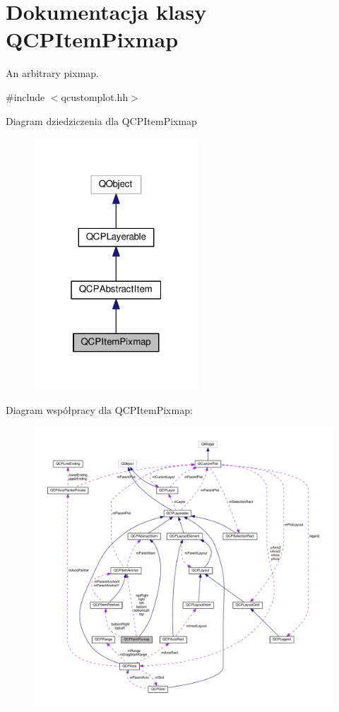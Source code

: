 \hypertarget{class_q_c_p_item_pixmap}{}\section{Dokumentacja klasy Q\+C\+P\+Item\+Pixmap}
\label{class_q_c_p_item_pixmap}


An arbitrary pixmap.  




{\ttfamily \#include $<$qcustomplot.\+hh$>$}



Diagram dziedziczenia dla Q\+C\+P\+Item\+Pixmap\nopagebreak
\begin{figure}[H]
\begin{center}
\leavevmode
\includegraphics[width=175pt]{class_q_c_p_item_pixmap__inherit__graph}
\end{center}
\end{figure}


Diagram współpracy dla Q\+C\+P\+Item\+Pixmap\+:\nopagebreak
\begin{figure}[H]
\begin{center}
\leavevmode
\includegraphics[width=350pt]{class_q_c_p_item_pixmap__coll__graph}
\end{center}
\end{figure}
